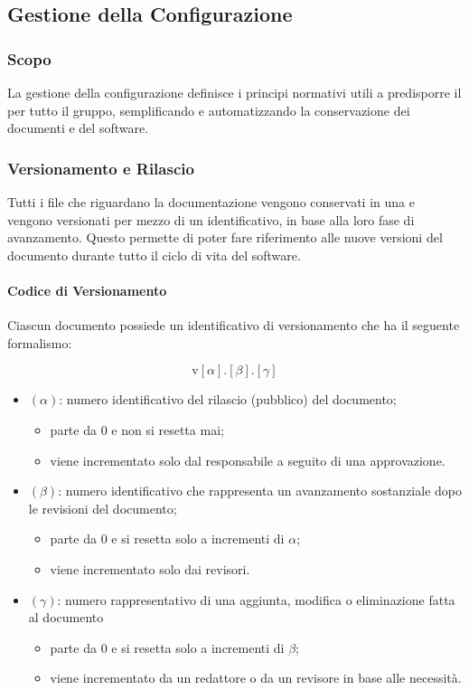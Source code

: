 \subsection{Gestione della Configurazione}

	\subsubsection{Scopo}	

	La gestione della configurazione definisce i principi normativi utili a predisporre il  per tutto il gruppo, semplificando e automatizzando la conservazione dei documenti e del software.

	\subsubsection{Versionamento e Rilascio}

	Tutti i file che riguardano la documentazione vengono conservati in una  e vengono versionati per mezzo di un identificativo, in base alla loro fase di avanzamento. Questo permette di poter fare riferimento alle nuove versioni del documento durante tutto il ciclo di vita del software.

		\paragraph{Codice di Versionamento}

		Ciascun documento possiede un identificativo di versionamento che ha il seguente formalismo:

		\[%
			\text{v}[\alpha].[\beta].[\gamma]
		\]

		\begin{itemize}
			\item \((\alpha)\): numero identificativo del rilascio (pubblico) del documento;
			\begin{itemize}
				\item parte da 0 e non si resetta mai;
				\item viene incrementato solo dal responsabile a seguito di una approvazione.
			\end{itemize}
			\item \((\beta)\): numero identificativo che rappresenta un avanzamento sostanziale dopo le revisioni del documento;
			\begin{itemize}
				\item parte da 0 e si resetta solo a incrementi di \(\alpha\);
				\item viene incrementato solo dai revisori.
			\end{itemize}
			\item \((\gamma)\): numero rappresentativo di una aggiunta, modifica o eliminazione fatta al documento
			\begin{itemize}
				\item parte da 0 e si resetta solo a incrementi di \(\beta\);
				\item viene incrementato da un redattore o da un revisore in base alle necessità. 
			\end{itemize}
		\end{itemize}

